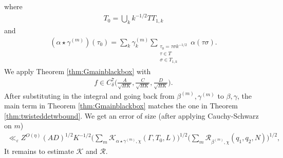 \documentclass[12pt]{amsart}
\theoremstyle{definition}
\theoremstyle{remark}
\numberwithin{equation}{section}
\newcommand{\1}{{\mathbf 1}}
\newcommand{\eps}{\varepsilon}
\begin{document}
where
\begin{align*}
    T_0 = \bigcup_{k} k^{-1/2} T T_{1,k}
\end{align*}
and
\begin{align*}
    (\alpha \star \gamma^{(m)}) ( \tau_0 ) =  \sum_k \gamma^{(m)}_k \sum_{\substack{\tau_0 = \tau \sigma k^{-1/2}  \\ \tau \in T \\ \sigma \in T_{1,k} } }  \alpha  ( \tau \sigma). 
\end{align*}
We apply Theorem \ref{thm:Gmainblackbox} with
\begin{align*}
    f \in C^7_\delta \bigg( \frac{A}{\sqrt{HK}},\frac{C}{\sqrt{HK}},\frac{D}{\sqrt{HK}}\bigg).
\end{align*}
After substituting in the integral and going back from $\beta^{(m)},\gamma^{(m)}$ to $\beta,\gamma$, the main term in Theorem \ref{thm:Gmainblackbox} matches the one in Theorem \ref{thm:twisteddetwbound}. We get an error of size (after applying Cauchy-Schwarz on $m$)
\begin{align*}
 \ll_\eps  Z^{O(\eta)}  (AD)^{1/2} K^{-1/2}\bigg(\sum_m \mathcal{K}_{\alpha \star \gamma^{(m)} ,\chi}(\Gamma,T_0,L)\bigg)^{1/2}\bigg(\sum_m \mathcal{R}_{\beta^{(m)},\chi}(q_1,q_2,N)\bigg)^{1/2},
\end{align*}
It remains to estimate $\mathcal{K}$ and $\mathcal{R}$.
\end{document}
